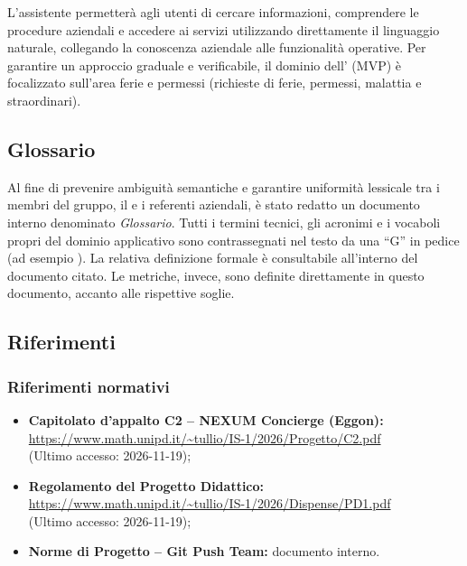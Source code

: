 \documentclass[documento]{gpt}
\begin{document}
L'assistente permetterà agli utenti di cercare informazioni, comprendere le procedure aziendali e accedere ai servizi utilizzando direttamente il linguaggio naturale, collegando la conoscenza aziendale alle funzionalità operative. Per garantire un approccio graduale e verificabile, il dominio dell' (MVP) è focalizzato sull'area ferie e permessi (richieste di ferie, permessi, malattia e straordinari).

\subsection{Glossario}
Al fine di prevenire ambiguità semantiche e garantire uniformità lessicale tra i membri del gruppo, il  e i referenti aziendali, è stato redatto un documento interno denominato \textit{Glossario}. Tutti i termini tecnici, gli acronimi e i vocaboli propri del dominio applicativo sono contrassegnati nel testo da una ``G'' in pedice (ad esempio ). La relativa definizione formale è consultabile all'interno del documento citato. Le metriche, invece, sono definite direttamente in questo documento, accanto alle rispettive soglie.

\subsection{Riferimenti}

\subsubsection{Riferimenti normativi}
\begin{itemize}
    \item \textbf{Capitolato d'appalto C2 -- NEXUM Concierge (Eggon):}\\
    \url{https://www.math.unipd.it/~tullio/IS-1/2026/Progetto/C2.pdf}\\
    (Ultimo accesso: 2026-11-19);
    \item \textbf{Regolamento del Progetto Didattico:}\\
    \url{https://www.math.unipd.it/~tullio/IS-1/2026/Dispense/PD1.pdf}\\
    (Ultimo accesso: 2026-11-19);
    \item \textbf{Norme di Progetto -- Git Push Team:} documento interno.
\end{itemize}
\end{document}
